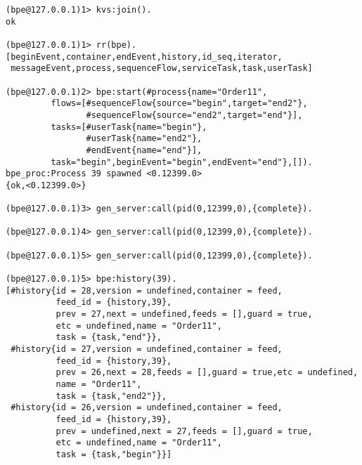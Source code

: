\vspace{1\baselineskip}
\begin{lstlisting}
(bpe@127.0.0.1)1> kvs:join().
ok

(bpe@127.0.0.1)1> rr(bpe).
[beginEvent,container,endEvent,history,id_seq,iterator,
 messageEvent,process,sequenceFlow,serviceTask,task,userTask]

(bpe@127.0.0.1)2> bpe:start(#process{name="Order11",
         flows=[#sequenceFlow{source="begin",target="end2"},
                #sequenceFlow{source="end2",target="end"}],
         tasks=[#userTask{name="begin"},
                #userTask{name="end2"},
                #endEvent{name="end"}],
         task="begin",beginEvent="begin",endEvent="end"},[]).
bpe_proc:Process 39 spawned <0.12399.0>
{ok,<0.12399.0>}

(bpe@127.0.0.1)3> gen_server:call(pid(0,12399,0),{complete}).

(bpe@127.0.0.1)4> gen_server:call(pid(0,12399,0),{complete}).

(bpe@127.0.0.1)5> gen_server:call(pid(0,12399,0),{complete}).

(bpe@127.0.0.1)5> bpe:history(39).
[#history{id = 28,version = undefined,container = feed,
          feed_id = {history,39},
          prev = 27,next = undefined,feeds = [],guard = true,
          etc = undefined,name = "Order11",
          task = {task,"end"}},
 #history{id = 27,version = undefined,container = feed,
          feed_id = {history,39},
          prev = 26,next = 28,feeds = [],guard = true,etc = undefined,
          name = "Order11",
          task = {task,"end2"}},
 #history{id = 26,version = undefined,container = feed,
          feed_id = {history,39},
          prev = undefined,next = 27,feeds = [],guard = true,
          etc = undefined,name = "Order11",
          task = {task,"begin"}}]
\end{lstlisting}

